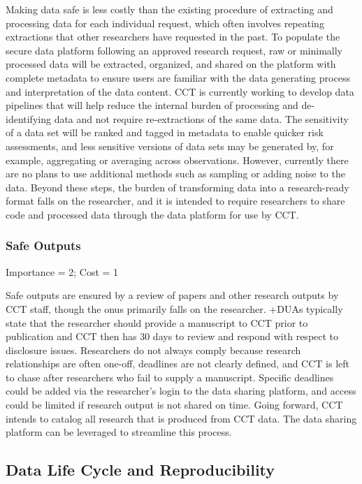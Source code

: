 \documentclass[
]{WileySix}
\begin{document}
Making data safe is less costly than the existing procedure of extracting and processing data for each individual request, which often involves repeating extractions that other researchers have requested in the past. To populate the secure data platform following an approved research request, raw or minimally processed data will be extracted, organized, and shared on the platform with complete metadata to ensure users are familiar with the data generating process and interpretation of the data content. CCT is currently working to develop data pipelines that will help reduce the internal burden of processing and de-identifying data and not require re-extractions of the same data. The sensitivity of a data set will be ranked and tagged in metadata to enable quicker risk assessments, and less sensitive versions of data sets may be generated by, for example, aggregating or averaging across observations. However, currently there are no plans to use additional methods such as sampling or adding noise to the data. Beyond these steps, the burden of transforming data into a research-ready format falls on the researcher, and it is intended to require researchers to share code and processed data through the data platform for use by CCT.

\hypertarget{safe-outputs-6}{%
\subsubsection{Safe Outputs}\label{safe-outputs-6}}

Importance = 2; Cost = 1

Safe outputs are ensured by a review of papers and other research outputs by CCT staff, though the onus primarily falls on the researcher. +DUAs\textbar{} typically state that the researcher should provide a manuscript to CCT prior to publication and CCT then has 30 days to review and respond with respect to disclosure issues. Researchers do not always comply because research relationships are often one-off, deadlines are not clearly defined, and CCT is left to chase after researchers who fail to supply a manuscript. Specific deadlines could be added via the researcher's login to the data sharing platform, and access could be limited if research output is not shared on time. Going forward, CCT intends to catalog all research that is produced from CCT data. The data sharing platform can be leveraged to streamline this process.

\hypertarget{data-life-cycle-and-reproducibility-1}{%
\subsection{Data Life Cycle and Reproducibility}\label{data-life-cycle-and-reproducibility-1}}
\end{document}
